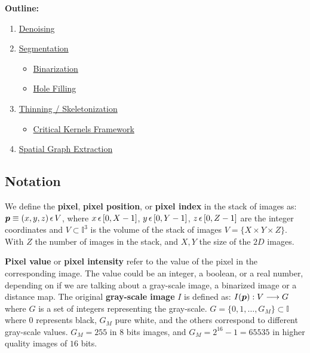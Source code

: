 \textbf{Outline:}
\begin{enumerate}
  \item \hyperref[sec:denoising]{Denoising}

  \item \hyperref[sec:segmentation]{Segmentation}

    \begin{itemize}
      \item \hyperref[sub:binarization]{Binarization}
      \item \hyperref[sub:hole_filling]{Hole Filling}
    \end{itemize}

  \item \hyperref[sec:skeletonization]{Thinning / Skeletonization}

    \begin{itemize}
      \item \hyperref[sub:critical_kernels_framework]{Critical Kernels Framework}
    \end{itemize}

  \item \hyperref[sec:spatial_graph_extraction]{Spatial Graph Extraction}
\end{enumerate}


\subsection{Notation}%
\label{sub:notation}

 We define the \textbf{pixel}, \textbf{pixel position}, or \textbf{pixel index}  in the stack of images as:
 $\boldsymbol{p}\equiv(x,y,z)\, \epsilon \,V$, where
 $x\,\epsilon \,{}[0,X - 1]$, $y\,\epsilon \,{}[0,Y - 1]$, $z\,\epsilon \,{}[0,Z - 1]$ are the integer coordinates and
 $V\subset \mathbb{I}^3$ is the volume of the stack of images $V=\{X\times
 Y\times Z\}$.
 With $Z$ the number of images in the stack, and $X,Y$ the size of the $2D$ images.

 \textbf{Pixel value} or \textbf{pixel intensity} refer to the value of the pixel in the corresponding
 image.
 The value could be an integer, a boolean, or a real number, depending on if we are
 talking about a gray-scale image, a binarized image or a distance map.
 The original \textbf{gray-scale image} $I$ is defined as:
 $I(\boldsymbol{p}):V \longrightarrow G$ where
 $G$ is a set of integers representing the gray-scale.
 $G=\{0,1,\ldots,G_M\}\subset\mathbb{I}$ where $0$ represents black, $G_M$
pure white, and the others correspond to different gray-scale values. $G_M=255$
in $8$ bits images, and $G_M=2^{16} - 1 = 65535$ in higher quality images of $16$ bits.

